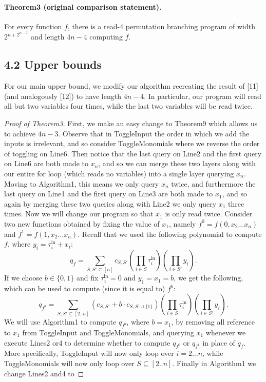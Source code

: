 \documentclass[10pt,a4paper]{article}
\begin{document}
\paragraph{Theorem3 (original comparison statement).} For every function $f$, there is a read-4 permutation branching program of width $2^{n+2^{n-1}}$ and length $4n-4$ computing $f$.

\subsection*{4.2 Upper bounds}
For our main upper bound, we modify our algorithm recreating the result of [11] (and analogously [12]) to have length $4n-4$. In particular, our program will read all but two variables four times, while the last two variables will be read twice.
\begin{proof}[Proof of Theorem3]
First, we make an easy change to Theorem9 which allows us to achieve $4n-3$. Observe that in ToggleInput the order in which we add the inputs is irrelevant, and so consider ToggleMonomials where we reverse the order of toggling on Line6. Then notice that the last query on Line2 and the first query on Line6 are both made to $x_n$, and so we can merge these two layers along with our entire for loop (which reads no variables) into a single layer querying $x_n$. Moving to Algorithm1, this means we only query $x_n$ twice, and furthermore the last query on Line1 and the first query on Line3 are both made to $x_1$, and so again by merging these two queries along with Line2 we only query $x_1$ three times.
Now we will change our program so that $x_1$ is only read twice. Consider two new functions obtained by fixing the value of $x_1$, namely $f^0=f(0,x_2\ldots x_n)$ and $f^1=f(1,x_2\ldots x_n)$. Recall that we used the following polynomial to compute $f$, where $y_i=\tau_i^{\mathrm{in}}+x_i$:
\[q_f=\sum_{S,S'\subseteq[n]}c_{S,S'}\left(\prod_{i\in S}\tau_i^{\mathrm{in}}\right)\left(\prod_{i\in S'}y_i\right).\]
If we choose $b\in\{0,1\}$ and fix $\tau_1^{\mathrm{in}}=0$ and $y_1=x_1=b$, we get the following, which can be used to compute (since it is equal to) $f^b$:
\[q_{f^b}=\sum_{S,S'\subseteq[2..n]}(c_{S,S'}+b\cdot c_{S,S'\cup\{1\}})\left(\prod_{i\in S}\tau_i^{\mathrm{in}}\right)\left(\prod_{i\in S'}y_i\right).\]
We will use Algorithm1 to compute $q_{f^b}$, where $b=x_1$, by removing all reference to $x_1$ from ToggleInput and ToggleMonomials, and querying $x_1$ whenever we execute Lines2 or4 to determine whether to compute $q_{f^0}$ or $q_{f^1}$ in place of $q_f$. More specifically, ToggleInput will now only loop over $i=2\ldots n$, while ToggleMonomials will now only loop over $S\subseteq[2..n]$. Finally in Algorithm1 we change Lines2 and4 to

\end{proof}
\end{document}
